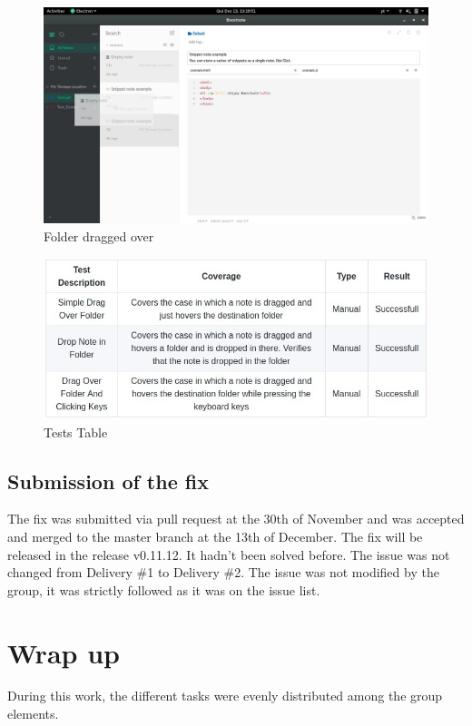 \begin{figure}
\centering
\includegraphics[width=5.72917in]{../DragExample.jpeg}
\caption{Folder dragged over}
\end{figure}

\begin{figure}
\centering
\includegraphics[width=5.72917in]{../TestHoverTable.jpeg}
\caption{Tests Table}
\end{figure}

\subsection{Submission of the fix}\label{submission-of-the-fix-1}

The fix was submitted via pull request at the 30th of November and was
accepted and merged to the master branch at the 13th of December. The
fix will be released in the release v0.11.12. It hadn't been solved
before. The issue was not changed from Delivery \#1 to Delivery \#2. The
issue was not modified by the group, it was strictly followed as it was
on the issue list.

\section{Wrap up}\label{wrap-up}

During this work, the different tasks were evenly distributed among the
group elements.
